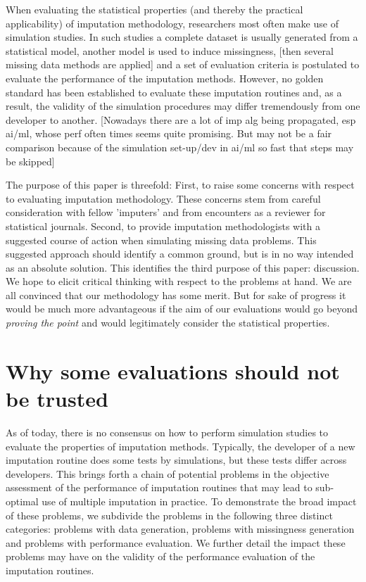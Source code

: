 \documentclass[bimj,fleqn]{w-art}
\begin{document}
When evaluating the statistical properties (and thereby the practical applicability) of imputation methodology, researchers most often make use of simulation studies. In such studies a complete dataset is usually generated from a statistical model, another model is used to induce missingness, [then several missing data methods are applied] and a set of evaluation criteria is postulated to evaluate the performance of the imputation methods. However, no golden standard has been established to evaluate these imputation routines and, as a result, the validity of the simulation procedures may differ tremendously from one developer to another. [Nowadays there are a lot of imp alg being propagated, esp ai/ml, whose perf often times seems quite promising. But may not be a fair comparison because of the simulation set-up/dev in ai/ml so fast that steps may be skipped]

The purpose of this paper is threefold: First, to raise some concerns with respect to evaluating imputation methodology. These concerns stem from careful consideration with fellow 'imputers' and from encounters as a reviewer for statistical journals. Second, to provide imputation methodologists with a suggested course of action when simulating missing data problems. This suggested approach should identify a common ground, but is in no way intended as an absolute solution. This identifies the third purpose of this paper: discussion. We hope to elicit critical thinking with respect to the problems at hand. We are all convinced that our methodology has some merit. But for sake of progress it would be much more advantageous if the aim of our evaluations would go beyond \emph{proving the point} and would legitimately consider the statistical properties. 



\section{Why some evaluations should not be trusted}

As of today, there is no consensus on how to perform simulation studies to evaluate the properties of imputation methods. Typically, the developer of a new imputation routine does some tests by simulations, but these tests differ across developers. This brings forth a chain of potential problems in the objective assessment of the performance of imputation routines that may lead to sub-optimal use of multiple imputation in practice. To demonstrate the broad impact of these problems, we subdivide the problems in the following three distinct categories: problems with data generation, problems with missingness generation and problems with performance evaluation. We further detail the impact these problems may have on the validity of the performance evaluation of the imputation routines. 
\end{document}
